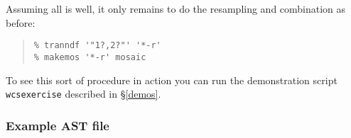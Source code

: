 \documentclass[twoside,11pt]{article}
\newcommand{\hyperref}[4]{#2\ref{#4}#3}
\newcommand{\latexhtml}[2]{#1}
\renewcommand{\_}{\texttt{\symbol{95}}}
\newcommand{\ttsize}{\latexhtml{\small}{}}
\newenvironment{myquote}{\begin{quote}\ttsize}{\end{quote}}
\begin{document}
Assuming all is well, it only remains to do the resampling and
combination as before:
\begin{myquote}
\begin{verbatim}
% tranndf '"1?,2?"' '*-r'
% makemos '*-r' mosaic
\end{verbatim}
\end{myquote}

To see this sort of procedure in action you can run the
demonstration script
\hyperref{{\tt wcsexercise}}{{\tt wcsexercise} described in \S}{}{demos}.



\subsubsection{Example AST file}
\end{document}
